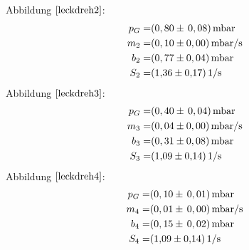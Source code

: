 	Abbildung $\ref{leckdreh2}$:
		\begin{align*}
			p_G=& (0,80 \pm \, 0,08) \, \si{mbar}\\
			m_2=& (0,10 \pm 0,00) \, \si{mbar/s}\\
			b_2=& (0,77 \pm 0,04) \, \si{mbar}\\
			S_2=& \SI{1,36 \pm 0,17}{1/s}
		\end{align*}
		Abbildung $\ref{leckdreh3}$:
			\begin{align*}
				p_G=& (0,40 \pm \, 0,04) \, \si{mbar}\\
				m_3=& (0,04 \pm 0,00)\, \si{mbar/s}\\
				b_3=& (0,31 \pm 0,08) \, \si{mbar}\\
				S_3=& \SI{1,09 \pm 0,14}{1/s}
			\end{align*}
		Abbildung $\ref{leckdreh4}$:
			\begin{align*}
				p_G=& (0,10 \pm \, 0,01) \, \si{mbar}\\
				m_4=& (0,01 \pm \, 0,00) \, \si{mbar/s}\\
				b_4=& (0,15 \pm \, 0,02) \, \si{mbar}\\
				S_4=& \SI{1,09 \pm 0,14}{1/s}
			\end{align*}
